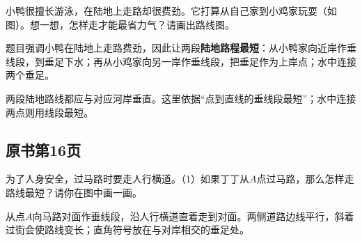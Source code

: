 小鸭很擅长游泳，在陆地上走路却很费劲。它打算从自己家到小鸡家玩耍（如图）。想一想，怎样走才能最省力气？请画出路线图。\par
{}
\begin{BookAnswer}
题目强调小鸭在陆地上走路费劲，因此让两段\textbf{陆地路程最短}：从小鸭家向近岸作垂线段，到垂足下水；再从小鸡家向另一岸作垂线段，把垂足作为上岸点；水中连接两个垂足。\par 两段陆地路线都应与对应河岸垂直。这里依据“点到直线的垂线段最短”；水中连接两点则用线段最短。
\end{BookAnswer}



\subsection*{原书第16页}

为了人身安全，过马路时要走人行横道。（1）如果丁丁从\(A\)点过马路，那么怎样走路线最短？请你在图中画一画。\par
{}
\begin{BookAnswer}
从点\(A\)向马路对面作垂线段，沿人行横道直着走到对面。两侧道路边线平行，斜着过街会使路线变长；直角符号放在与对岸相交的垂足处。
\end{BookAnswer}

